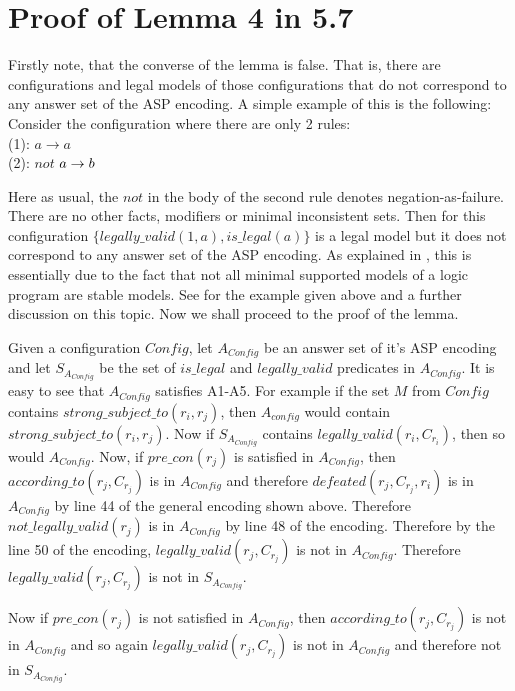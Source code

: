 \section{Proof of Lemma 4 in 5.7}\label{sec:proofs}

Firstly note, that the converse of the lemma is false. That is, there are configurations and legal models of those configurations that do not correspond to any answer set of the ASP encoding. A simple example of this is the following: Consider the configuration where there are only 2 rules:\\ (1): $a\rightarrow a$\\
(2): $not$ $a\rightarrow b\\$

Here as usual, the $not$ in the body of the second rule denotes negation-as-failure. There are no other facts, modifiers or minimal inconsistent sets. Then for this configuration $\{legally\_valid(1,a), is\_legal(a)\}$ is a legal model but it does not correspond to any answer set of the ASP encoding. As explained in \citep{KRR_notes}, this is essentially due to the fact that not all minimal supported models of a logic program are stable models. See \citep{KRR_notes} for the example given above and a further discussion on this topic.  Now we shall proceed to the proof of the lemma.

Given a configuration $Config$, let $A_{Config}$ be an answer set of it's ASP encoding and let $S_{A_{Config}}$ be the set of $is\_legal$ and $legally\_valid$ predicates in $A_{Config}$. It is easy to see that $A_{Config}$ satisfies A1-A5. For example if the set $M$ from $Config$ contains $strong\_subject\_to(r_{i}, r_{j})$, then $A_{config}$ would contain $strong\_subject\_to(r_{i}, r_{j})$. Now if $S_{A_{Config}}$ contains $legally\_valid(r_{i}, C_{r_{i}})$, then so would $A_{Config}$. Now, if $pre\_con(r_{j})$ is satisfied in $A_{Config}$, then $according\_to(r_{j},C_{r_{j}})$ is in $A_{Config}$ and therefore $defeated(r_{j}, C_{r_{j}}, r_{i})$ is in $A_{Config}$ by line 44 of the general encoding shown above. Therefore $not\_legally\_valid(r_{j})$ is in $A_{Config}$ by line 48 of the encoding. Therefore by the line 50 of the encoding, $legally\_valid(r_{j},C_{r_{j}})$ is not in $A_{Config}$. Therefore $legally\_valid(r_{j},C_{r_{j}})$ is not in $S_{A_{Config}}$.

Now if $pre\_con(r_{j})$ is not satisfied in $A_{Config}$, then $according\_to(r_{j},C_{r_{j}})$ is not in $A_{Config}$ and so again $legally\_valid(r_{j},C_{r_{j}})$ is not in $A_{Config}$ and therefore not in $S_{A_{Config}}$.

